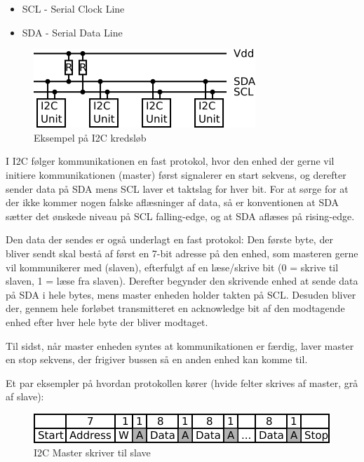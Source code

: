\begin{itemize}
    \item SCL - Serial Clock Line
    \item SDA - Serial Data Line
\end{itemize}

\begin{figure}[H] \centering
    \includegraphics{0_Filer/Figuer/5_HW_Design/I2C_opsaetning.png}
    \caption{Eksempel på I2C kredsløb}
    \label{fig:HWD_I2C_kreds}
\end{figure}

I I2C følger kommunikationen en fast protokol, hvor den enhed der gerne vil initiere kommunikationen (master) først signalerer en start sekvens, og derefter sender data på SDA mens SCL laver et taktslag for hver bit. For at sørge for at der ikke kommer nogen falske aflæsninger af data, så er konventionen at SDA sætter det ønskede niveau på SCL falling-edge, og at SDA aflæses på rising-edge.

Den data der sendes er også underlagt en fast protokol: Den første byte, der bliver sendt skal bestå af først en 7-bit adresse på den enhed, som masteren gerne vil kommunikerer med (slaven), efterfulgt af en læse/skrive bit (0 = skrive til slaven, 1 = læse fra slaven). Derefter begynder den skrivende enhed at sende data på SDA i hele bytes, mens master enheden holder takten på SCL. Desuden bliver der, gennem hele forløbet transmitteret en acknowledge bit af den modtagende enhed efter hver hele byte der bliver modtaget.

Til sidst, når master enheden syntes at kommunikationen er færdig, laver master en stop sekvens, der frigiver bussen så en anden enhed kan komme til.

Et par eksempler på hvordan protokollen kører (hvide felter skrives af master, grå af slave):

\begin{figure}[H] \centering
    \includegraphics{0_Filer/Figuer/5_HW_Design/I2C_Write.png}
    \caption{I2C Master skriver til slave}
    \label{fig:HWD_I2C_write}
\end{figure}

